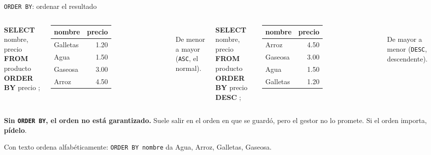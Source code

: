 \documentclass[aspectratio=169,10pt,c]{beamer}
\newcommand{\kw}[1]{\textcolor{utpRojo}{\textbf{#1}}}
\newcommand{\nuevo}[1]{{%
  \setlength{\fboxsep}{1.2pt}%
  \begingroup
  \renewcommand{\kw}[1]{\textcolor{utpNegro}{\textbf{##1}}}%
  \colorbox{yellow!45}{\textcolor{utpNegro}{#1}}%
  \endgroup}}
\newenvironment{sqlcode}[1][.86\textwidth]
  {\begin{center}\begin{lrbox}{\sqlbuf}\begin{minipage}{#1}\ttfamily\footnotesize\vspace{6pt}\raggedright}
  {\vspace{6pt}\end{minipage}\end{lrbox}\colorbox{utpGrisClaro}{\usebox{\sqlbuf}}\end{center}}
\begin{document}
\begin{frame}{\texttt{ORDER BY}: ordenar el resultado}
\begin{columns}[T,onlytextwidth]
\begin{sqlcode}[\textwidth]
\scriptsize
\kw{SELECT} nombre, precio \kw{FROM} producto\\
\nuevo{\kw{ORDER BY} precio};
\end{sqlcode}
\vspace{-0.25cm}
\centering\scriptsize\ttfamily
\begin{tabular}{lr}
\toprule
\normalfont\bfseries nombre & \normalfont\bfseries precio \\
\midrule
Galletas & 1.20 \\
Agua & 1.50 \\
Gaseosa & 3.00 \\
Arroz & 4.50 \\
\bottomrule
\end{tabular}\\[6pt]
\normalfont\small De menor a mayor (\texttt{ASC}, el normal).
\begin{sqlcode}[\textwidth]
\scriptsize
\kw{SELECT} nombre, precio \kw{FROM} producto\\
\nuevo{\kw{ORDER BY} precio \kw{DESC}};
\end{sqlcode}
\vspace{-0.25cm}
\centering\scriptsize\ttfamily
\begin{tabular}{lr}
\toprule
\normalfont\bfseries nombre & \normalfont\bfseries precio \\
\midrule
Arroz & 4.50 \\
Gaseosa & 3.00 \\
Agua & 1.50 \\
Galletas & 1.20 \\
\bottomrule
\end{tabular}\\[6pt]
\normalfont\small De mayor a menor (\texttt{DESC}, descendente).
\end{columns}
\vspace{0.4cm}
\small \textbf{Sin \texttt{ORDER BY}, el orden no está garantizado.} Suele salir en el orden en que se guardó, pero el gestor no lo promete. Si el orden importa, \textbf{pídelo}.
\vspace{0.15cm}

\small Con texto ordena alfabéticamente: \texttt{ORDER BY nombre} da Agua, Arroz, Galletas, Gaseosa.
\end{frame}
\end{document}
